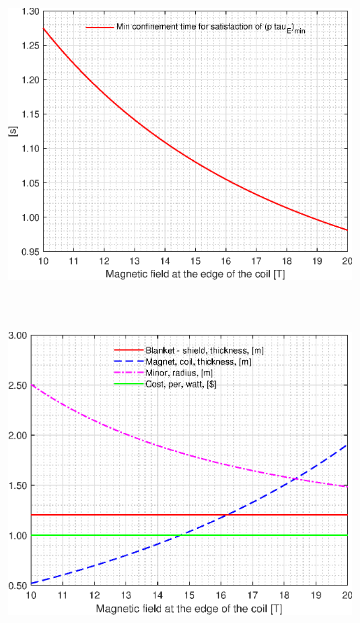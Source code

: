 \begin{figure}[H]
	\centering
	\begin{subfigure}[b]{.45\textwidth}
		\includegraphics[width=\textwidth]{MatlabFigures/Bmax/f1.eps}
	\end{subfigure}
	~
	\begin{subfigure}[b]{.45\textwidth}
		\includegraphics[width=\textwidth]{MatlabFigures/Bmax/f2.eps}
	\end{subfigure}


\end{figure}

